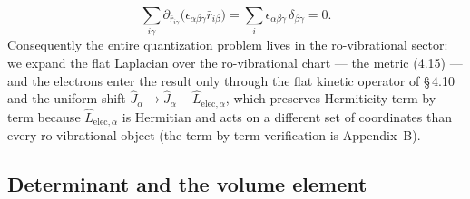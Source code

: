 \begin{equation}
\sum_{i\gamma}\partial_{\bar r_{i\gamma}}\bigl(\epsilon_{\alpha\beta\gamma}\bar r_{i\beta}\bigr)
=\sum_i\epsilon_{\alpha\beta\gamma}\,\delta_{\beta\gamma}=0 . \tag{4.18}
\end{equation}
Consequently the entire quantization problem lives in the ro-vibrational sector: we expand the flat Laplacian over the ro-vibrational chart --- the metric (4.15) --- and the electrons enter the result only through the flat kinetic operator of \S\,4.10 and the uniform shift $\hat J_\alpha\to\hat J_\alpha-\hat L_{\mathrm{elec},\alpha}$, which preserves Hermiticity term by term because $\hat L_{\mathrm{elec},\alpha}$ is Hermitian and acts on a different set of coordinates than every ro-vibrational object (the term-by-term verification is Appendix~B).

\subsection{Determinant and the volume element}

